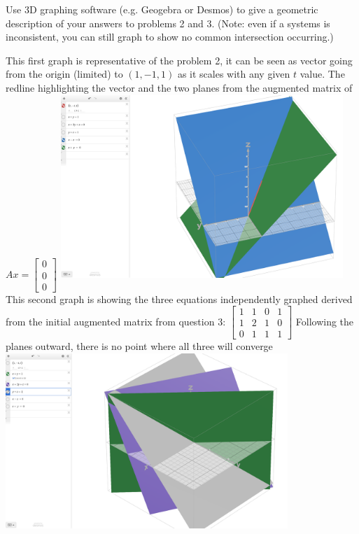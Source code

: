 \documentclass[12pt,letterpaper, onecolumn]{exam}
\begin{document}
\begin{questions}
    \question Use 3D graphing software (e.g. Geogebra or Desmos) to give a geometric description of your answers to problems 2 and 3. (Note: even if a systems is inconsistent, you can still graph to show no common intersection occurring.)
    \begin{solution}
    
        \begin{center}
        This first graph is representative of the problem 2, it can be seen as vector going from the origin (limited) to $(1, -1, 1)$ as it scales with any given $t$ value. The redline highlighting the vector and the two planes from the augmented matrix of $Ax = \begin{bmatrix}
            0\\0\\0
        \end{bmatrix}$
        \includegraphics[width=0.8\textwidth]{GraphOfNumber2.png}\\
        This second graph is showing the three equations independently graphed derived from the initial augmented matrix from question 3: $\begin{bmatrix}
                1 & 1 & 0 & 1\\
                1 & 2 & 1 & 0\\
                0 & 1 & 1 & 1
            \end{bmatrix}$ Following the planes outward, there is no point where all three will converge\\
        \includegraphics[width=0.8\textwidth]{GraphOfNumber3.png}
    \end{center}
    \end{solution}
    
\end{questions}
\end{document}
